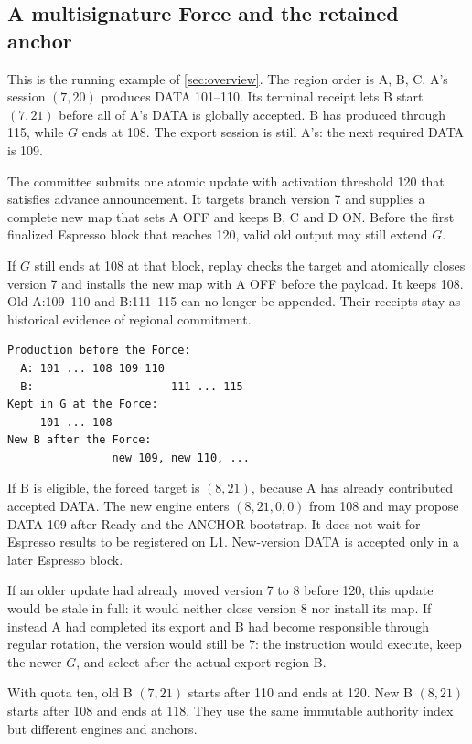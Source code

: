 \documentclass[11pt,a4paper]{article}
\begin{document}
\subsection{A multisignature Force and the retained anchor}
\label{sec:force-example}
This is the running example of \cref{sec:overview}. The region order is
A, B, C. A's session $(7,20)$ produces DATA 101--110. Its terminal receipt
lets B start $(7,21)$ before all of A's DATA is globally accepted. B has
produced through 115, while $G$ ends at 108. The export session is still
A's: the next required DATA is 109.

The committee submits one atomic update with activation threshold 120
that satisfies advance announcement. It targets branch version 7 and
supplies a complete new map that sets A OFF and keeps B, C and D ON.
Before the first finalized Espresso block that
reaches 120, valid old output may still extend $G$.

If $G$ still ends at 108 at that block, replay checks the target and
atomically closes version 7 and installs the new map with A OFF before
the payload. It keeps 108. Old
A:109--110 and B:111--115 can no longer be appended. Their receipts stay
as historical evidence of regional commitment.

\begin{center}\small
\begin{verbatim}
Production before the Force:
  A: 101 ... 108 109 110
  B:                     111 ... 115
Kept in G at the Force:
     101 ... 108
New B after the Force:
                new 109, new 110, ...
\end{verbatim}
\end{center}

If B is eligible, the forced target is $(8,21)$, because A has already
contributed accepted DATA. The new engine enters $(8,21,0,0)$ from 108 and
may propose DATA 109 after Ready and the ANCHOR bootstrap. It does not
wait for Espresso results to be registered on L1. New-version DATA is
accepted only in a later Espresso block.

If an older update had already moved version 7 to 8 before 120, this
update would be stale in full: it would neither close version 8 nor
install its map. If instead A had completed its export and B had become
responsible through regular rotation, the version would still be 7: the
instruction would execute, keep the newer $G$, and select after the
actual export region B.

With quota ten, old B $(7,21)$ starts after 110 and ends at 120. New B
$(8,21)$ starts after 108 and ends at 118. They use the same immutable
authority index but different engines and anchors.
\end{document}
